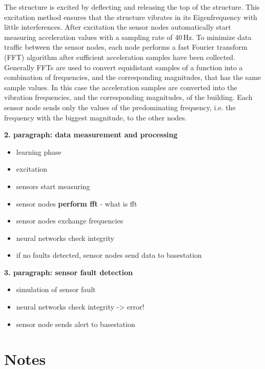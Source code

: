 \documentclass[12pt,a4paper]{scrartcl}
\begin{document}
The structure is excited by deflecting and releasing the top of the structure.
This excitation method ensures that the structure vibrates in its Eigenfrequency with little interferences.
After excitation the sensor nodes automatically start measuring acceleration values with a sampling rate of 40\,Hz.
To minimize data traffic between the sensor nodes, each node performs a fast Fourier transform (FFT) algorithm after sufficient acceleration samples have been collected.
Generally FFTs are used to convert equidistant samples of a function into a combination of frequencies, and the corresponding magnitudes, that has the same sample values.
In this case the acceleration samples are converted into the vibration frequencies, and the corresponding magnitudes, of the building.
Each sensor node sends only the values of the predominating frequency, i.e. the frequency with the biggest magnitude, to the other nodes.





\textbf{2. paragraph: data measurement and processing}

\begin{itemize}
\item learning phase
\item excitation
\item sensors start measuring
\item sensor nodes \textbf{perform fft} - what is fft
\item sensor nodes exchange frequencies
\item neural networks check integrity
\item if no faults detected, sensor nodes send data to basestation
\end{itemize}

\textbf{3. paragraph: sensor fault detection}

\begin{itemize}
\item simulation of sensor fault
\item neural networks check integrity -> error!
\item sensor node sends alert to basestation
\end{itemize}


\section*{Notes}
\end{document}
